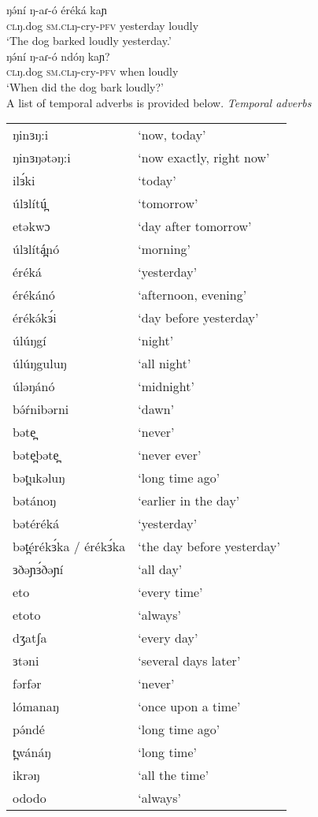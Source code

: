 \ea
\ea \gll	ŋə́ní	ŋ-aɾ-ó 	éréká	kaɲ\\
		\textsc{cl}ŋ.dog	\textsc{sm.cl}ŋ-cry-\textsc{pfv}	yesterday	loudly\\
\trans		‘The dog barked loudly yesterday.’\\
\ex \gll	ŋə́ní	ŋ-aɾ-ó	ndóŋ	kaɲ?\\
		\textsc{cl}ŋ.dog	\textsc{sm.cl}ŋ-cry-\textsc{pfv}	when	loudly\\
\trans		‘When did the dog bark loudly?’\\
\z
\z
A list of temporal adverbs is provided below.
\ea \textit{Temporal adverbs}\\
\begin{supertabular}[t]{ll}
ŋinɜŋ:i		&	`now, today'			\\%
ŋinɜŋətəŋ:i	&	`now exactly, right now'\\
ilɜ́ki		&  `today'\\
úlɜlítú̪		&	`tomorrow'\\
etəkwɔ		&	`day after tomorrow'\\
úlɜlítá̪nó	&	`morning'\\
éréká		&	`yesterday'\\
érékánó		&	`afternoon, evening'\\
érékə́kɜ́i	&	`day before yesterday'\\
úlúŋgí		&	`night'\\
úlúŋguluŋ	&	`all night'\\
úləŋánó		&	`midnight'\\
bə́ŕnibərni	&	`dawn'\\
bəte̪		&	`never'\\
bəte̪bəte̪	&	`never ever'\\
bət̪ukəluŋ	&	`long time ago'\\
bətánoŋ		&	`earlier in the day'	\\%
bətéréká	&	`yesterday'\\
bət̪érékɜ́ka / érékɜ́ka	&	`the day before yesterday'\\
ɜðəɲɜ́ðəɲí	&	`all day'		\\ %
eto			&	`every time'\\
etoto		&	`always'\\
dʒatʃa		&	`every day'\\
ɜtəni		&	`several days later'\\
fərfər		&	`never'\\
lómanaŋ		&	`once upon a time'\\
pə́ndé		&	`long time ago'\\
t̪wánáŋ		&	`long time'\\
ikrəŋ		&	‘all the time’\\
ododo		&	‘always’\\
\end{supertabular}
